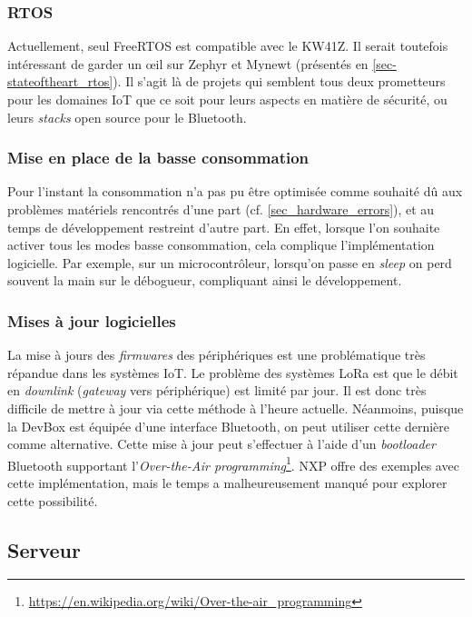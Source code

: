 \subsubsection{RTOS}

Actuellement, seul FreeRTOS est compatible avec le KW41Z. Il serait toutefois intéressant de garder un \oe il sur Zephyr et Mynewt (présentés en \cref{sec-stateoftheart_rtos}). Il s'agit là de projets qui semblent tous deux prometteurs pour les domaines IoT que ce soit pour leurs aspects en matière de sécurité, ou leurs \textit{stacks} open source pour le Bluetooth.


\subsubsection{Mise en place de la basse consommation}


Pour l'instant la consommation n'a pas pu être optimisée comme souhaité dû aux problèmes matériels rencontrés d'une part (cf. \cref{sec_hardware_errors}), et au temps de développement restreint d'autre part. En effet, lorsque l'on souhaite activer tous les modes basse consommation, cela complique l'implémentation logicielle. Par exemple, sur un microcontrôleur, lorsqu'on passe en \textit{sleep} on perd souvent la main sur le débogueur, compliquant ainsi le développement. 


\subsubsection{Mises à jour logicielles}

La mise à jours des \textit{firmwares} des périphériques est une problématique très répandue dans les systèmes IoT. Le problème des systèmes LoRa est que le débit en \textit{downlink} (\textit{gateway} vers périphérique) est limité par jour. Il est donc très difficile de mettre à jour via cette méthode à l'heure actuelle. Néanmoins, puisque la DevBox est équipée d'une interface Bluetooth, on peut utiliser cette dernière comme alternative. Cette mise à jour peut s'effectuer à l'aide d'un \textit{bootloader} Bluetooth supportant l'\textit{Over-the-Air programming}\footnote{\url{https://en.wikipedia.org/wiki/Over-the-air_programming}}. NXP offre des exemples avec cette implémentation, mais le temps a malheureusement manqué pour explorer cette possibilité.

\subsection{Serveur}

